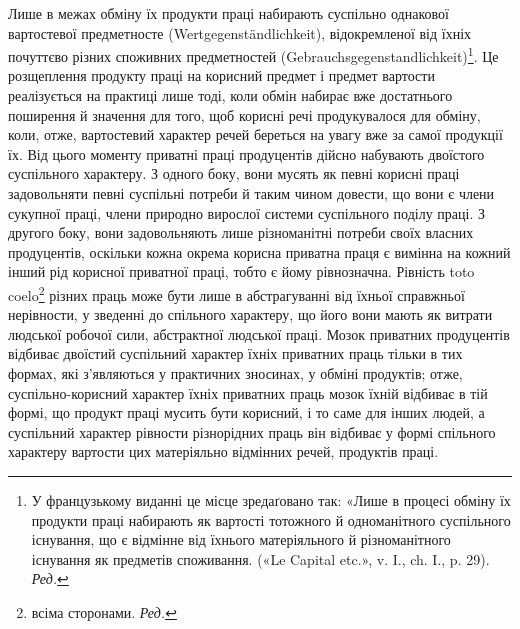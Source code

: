 Лише в межах обміну їх продукти праці набирають суспільно
однакової вартостевої предметносте (Wertgegenständlichkeit), відокремленої
від їхніх почуттєво різних споживних предметностей
(Gebrauchsgegenstandlichkeit)\footnote*{
У французькому виданні це місце зредаґовано так: «Лише в процесі
обміну їх продукти праці набирають як вартості тотожного й одноманітного
суспільного існування, що є відмінне від їхнього матеріяльного
й різноманітного існування як предметів споживання. («Le Capital
etc.», v. I., ch. I., p. 29). \emph{Ред.}
}. Це розщеплення продукту праці
на корисний предмет і предмет вартости реалізується на практиці
лише тоді, коли обмін набирає вже достатнього поширення й значення
для того, щоб корисні речі продукувалося для обміну, коли,
отже, вартостевий характер речей береться на увагу вже за самої
продукції їх. Від цього моменту приватні праці продуцентів
дійсно набувають двоїстого суспільного характеру. З одного боку,
вони мусять як певні корисні праці задовольняти певні суспільні
потреби й таким чином довести, що вони є члени сукупної праці,
члени природно вирослої системи суспільного поділу праці. З другого
боку, вони задовольняють лише різноманітні потреби своїх
власних продуцентів, оскільки кожна окрема корисна приватна
праця є вимінна на кожний інший рід корисної приватної праці,
тобто є йому рівнозначна. Рівність toto coelo\footnote*{
всіма сторонами. \emph{Ред.}
} різних праць може
бути лише в абстрагуванні від їхньої справжньої нерівности, у
зведенні до спільного характеру, що його вони мають як витрати
людської робочої сили, абстрактної людської праці. Мозок приватних
продуцентів відбиває двоїстий суспільний характер їхніх
приватних праць тільки в тих формах, які з’являються у практичних
зносинах, у обміні продуктів; отже, суспільно-корисний
характер їхніх приватних праць мозок їхній відбиває в тій формі,
що продукт праці мусить бути корисний, і то саме для інших
людей, а суспільний характер рівности різнорідних праць він
відбиває у формі спільного характеру вартости цих матеріяльно
відмінних речей, продуктів праці.


